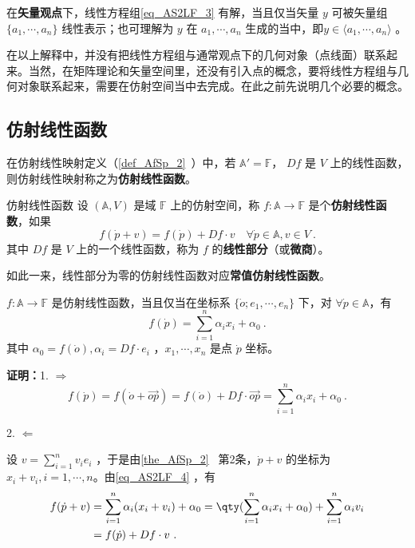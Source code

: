 在\textbf{矢量观点}下，线性方程组\autoref{eq_AS2LF_3} 有解，当且仅当矢量 $y$ 可被矢量组 $\{a_1,\cdots,a_n\}$ 线性表示；也可理解为 $y$ 在 $a_1,\cdots,a_n$ 生成的当中，即$y\in\langle a_1,\cdots,a_n\rangle$ 。

在以上解释中，并没有把线性方程组与通常观点下的几何对象（点线面）联系起来。当然，在矩阵理论和矢量空间里，还没有引入点的概念，要将线性方程组与几何对象联系起来，需要在仿射空间当中去完成。在此之前先说明几个必要的概念。
\subsection{仿射线性函数}
在仿射线性映射定义（\autoref{def_AfSp_2}~）中，若 $\mathbb A'=\mathbb F$， $Df$ 是 $V$ 上的线性函数，则仿射线性映射称之为\textbf{仿射线性函数}。
\begin{definition}{仿射线性函数}
设 $(\mathbb A,V)$ 是域 $\mathbb {F}$ 上的仿射空间，称 $f:\mathbb A\rightarrow \mathbb F$ 是个\textbf{仿射线性函数}，如果
\begin{equation}
f(\dot p+v)=f(\dot p)+Df\cdot v\quad\forall \dot p\in\mathbb A,v\in V~.
\end{equation}
其中 $Df$ 是 $V$ 上的一个线性函数，称为 $f$ 的\textbf{线性部分}（或\textbf{微商}）。
\end{definition}
如此一来，线性部分为零的仿射线性函数对应\textbf{常值仿射线性函数}。
\begin{theorem}{}\label{the_AS2LF_1}
 $f:\mathbb A\rightarrow \mathbb F$ 是仿射线性函数，当且仅当在坐标系 $\{\dot o;e_1,\cdots,e_n\}$ 下，对 $\forall \dot p\in \mathbb A$，有
 \begin{equation}\label{eq_AS2LF_4}
 f(\dot p)=\sum_{i=1}^n\alpha_ix_i+\alpha_0~.
 \end{equation}
 其中 $\alpha_0=f(\dot o),\alpha_i=Df\cdot e_i$ ，$x_1,\cdots,x_n$ 是点 $\dot p$ 坐标。
\end{theorem}
\textbf{证明：}1. $\Rightarrow$
\begin{equation}
f(\dot p)=f(\dot o+\vec{op})=f(\dot o)+Df\cdot \vec{op}=\sum_{i=1}^n \alpha_i x_i+\alpha_0~.
\end{equation}


2. $\Leftarrow$

设 $v=\sum\limits_{i=1}^n v_ie_i$ ，于是由\autoref{the_AfSp_2}~ 第2条，$\dot p+v$ 的坐标为 $x_i+v_i,i=1,\cdots ,n$。由\autoref{eq_AS2LF_4} ，有
\begin{equation}
\begin{aligned}
f(\dot p+v)&=\sum_{i=1}^n\alpha_i(x_i+v_i)+\alpha_0=\qty(\sum_{i=1}^n\alpha_i x_i+\alpha_0)+\sum_{i=1}^n\alpha_i v_i\\
&=f(\dot p)+Df\cdot v~.
\end{aligned}
\end{equation}

